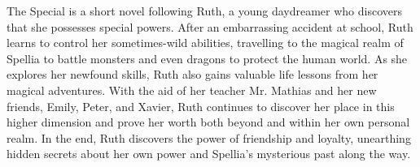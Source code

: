  The Special is a short novel following Ruth, a young daydreamer who discovers that she possesses special powers. After an embarrassing accident at school, Ruth learns to control her sometimes-wild abilities, travelling to the magical realm of Spellia to battle monsters and even dragons to protect the human world. As she explores her newfound skills, Ruth also gains valuable life lessons from her magical adventures. With the aid of her teacher Mr. Mathias and her new friends, Emily, Peter, and Xavier, Ruth continues to discover her place in this higher dimension and prove her worth both beyond and within her own personal realm. In the end, Ruth discovers the power of friendship and loyalty, unearthing hidden secrets about her own power and Spellia's mysterious past along the way.